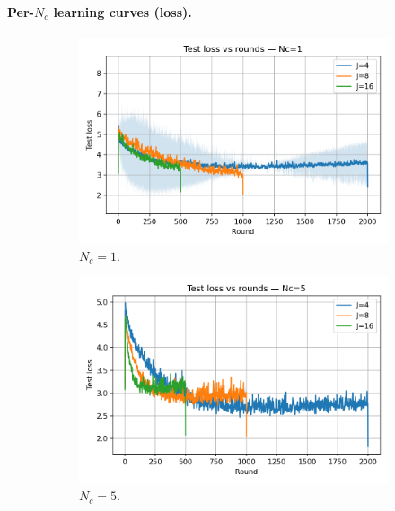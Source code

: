 \documentclass[10pt,twocolumn,letterpaper]{article}
\begin{document}
\paragraph{Per-\(N_c\) learning curves (loss).}
\begin{figure}[H]
  \centering
  \begin{subfigure}[b]{0.32\linewidth}
    \centering
    \includegraphics[width=\linewidth]{heter_figs/loss_vs_rounds_Nc_1.png}
    \caption{\(N_c=1\).}
  \end{subfigure}
  \hfill
  \begin{subfigure}[b]{0.32\linewidth}
    \centering
    \includegraphics[width=\linewidth]{heter_figs/loss_vs_rounds_Nc_5.png}
    \caption{\(N_c=5\).}
  \end{subfigure}
  \hfill
  \begin{subfigure}[b]{0.32\linewidth}
    \centering

\end{subfigure}
\end{figure}
\end{document}

